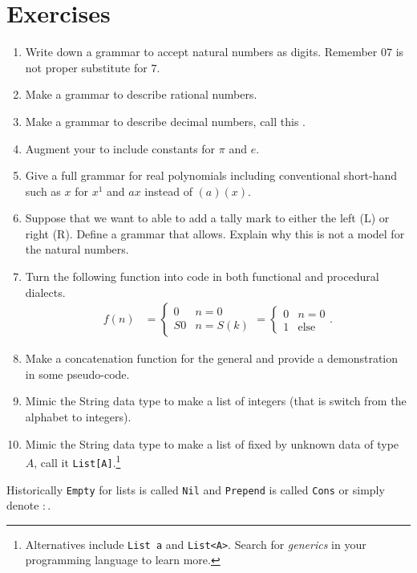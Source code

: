 
\section*{Exercises}

\begin{enumerate}
    \item Write down a grammar to accept natural numbers as digits.  Remember $07$ is not proper substitute for $7$.
    \item Make a grammar to describe rational numbers.
    \item Make a grammar to describe decimal numbers, call this .  
    \item Augment your  to include constants for $\pi$ and $e$.
    \item Give a full grammar for real polynomials including conventional short-hand 
    such as $x$ for $x^1$ and $ax$ instead of $(a)(x)$.
    
    \item Suppose that we want to able to add a tally mark to either the left (L) or right (R).
    Define a grammar that allows.  Explain why this is not a model for the natural numbers.
        
    \item Turn the following function into code in both functional and procedural dialects.
    \begin{align*}
        f(n) & = \begin{cases}
                    0 & n=0\\
                    S0 & n=S(k)
        \end{cases}
         =\begin{cases} 0 & n=0 \\ 1 & \text{else}\end{cases}.
    \end{align*}
    
    \item Make a concatenation function for the general  and 
    provide a demonstration in some pseudo-code.
    \item Mimic the String data type to make a list of integers (that is 
    switch from the alphabet to integers).

    \item Mimic the String data type to make a list of fixed by 
    unknown data of type $A$, call it \lstinline{List[A]}.\footnote{
    Alternatives include \lstinline{List a} and \lstinline{List<A>}. 
    Search for \emph{generics} in your programming language to learn more.
    }

\end{enumerate}
Historically \lstinline{Empty} for lists is called \lstinline{Nil} 
and \lstinline{Prepend} is called \lstinline{Cons} or simply denote $:$.
